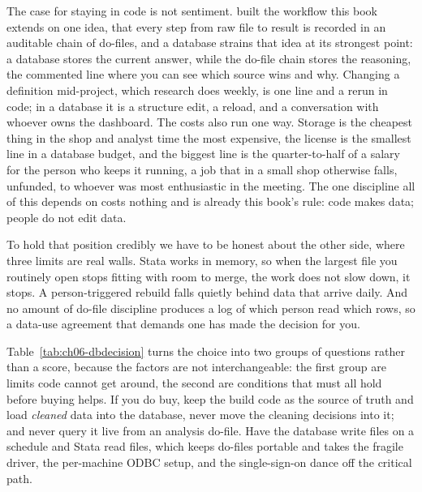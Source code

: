 \documentclass[
    a4paper,
    fontsize=10pt,
    twoside=true,
    numbers=noenddot,
]{kaobook}
\begin{document}
The case for staying in code is not sentiment. \textcite{long2009workflow} built the workflow this book extends on one idea, that every step from raw file to result is recorded in an auditable chain of do-files, and a database strains that idea at its strongest point: a database stores the current answer, while the do-file chain stores the reasoning, the commented line where you can see which source wins and why. Changing a definition mid-project, which research does weekly, is one line and a rerun in code; in a database it is a structure edit, a reload, and a conversation with whoever owns the dashboard. The costs also run one way. Storage is the cheapest thing in the shop and analyst time the most expensive, the license is the smallest line in a database budget, and the biggest line is the quarter-to-half of a salary for the person who keeps it running, a job that in a small shop otherwise falls, unfunded, to whoever was most enthusiastic in the meeting. The one discipline all of this depends on costs nothing and is already this book's rule: code makes data; people do not edit data.

To hold that position credibly we have to be honest about the other side, where three limits are real walls. Stata works in memory, so when the largest file you routinely open stops fitting with room to merge, the work does not slow down, it stops. A person-triggered rebuild falls quietly behind data that arrive daily. And no amount of do-file discipline produces a log of which person read which rows, so a data-use agreement that demands one has made the decision for you.

Table~\ref{tab:ch06-dbdecision} turns the choice into two groups of questions rather than a score, because the factors are not interchangeable: the first group are limits code cannot get around, the second are conditions that must all hold before buying helps. If you do buy, keep the build code as the source of truth and load \emph{cleaned} data into the database, never move the cleaning decisions into it; and never query it live from an analysis do-file. Have the database write files on a schedule and Stata read files, which keeps do-files portable and takes the fragile driver, the per-machine ODBC setup, and the single-sign-on dance off the critical path.
\end{document}
